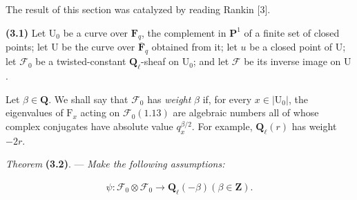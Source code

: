 \documentclass[10pt,leqno]{article}
\begin{document}
\noindent The result of this section was catalyzed by reading Rankin [3].\par

\noindent \textbf{(3.1)} Let \(\mathrm{U}_{0}\) be a curve over \(\mathbf{F}_{q}\), the complement in \(\mathbf{P}^{1}\) of a finite set of closed points; let \(\mathrm{U}\) be the curve over \(\overline{\mathbf{F}}_{q}\) obtained from it; let \(u\) be a closed point of \(\mathrm{U}\); let \(\mathcal{F} _{0}\) be a twisted-constant \(\mathbf{Q}_{\ell }\)-sheaf on \(\mathrm{U}_{0}\); and let \(\mathcal{F} \) be its inverse image on \(\mathrm{U}\).\par

\clearpage

\label{physical-13}\par\smallskip

\noindent Let \(\beta \in \mathbf{Q}\). We shall say that \(\mathcal{F} _{0}\) has \emph{weight} \(\beta \) if, for every \(x\in |\mathrm{U}_{0}|\), the eigenvalues of \(\mathrm{F}_{x}\) acting on \(\mathcal{F} _{0} (1.13)\) are algebraic numbers all of whose complex conjugates have absolute value \(q_{x}^{\beta /2}\). For example, \(\mathbf{Q}_{\ell }(r)\) has weight \(- 2r\).\par

\noindent \emph{Theorem} \textbf{(3.2)}. — {\itshape Make the following assumptions:}\par

\par

\begin{equation*}\begin{gathered}\psi  : \mathcal{F} _{0}\otimes \mathcal{F} _{0} \longrightarrow  \mathbf{Q}_{\ell }(- \beta )    (\beta \in \mathbf{Z}).\end{gathered}\end{equation*}

\par

\par
\end{document}
